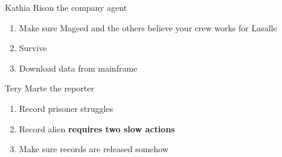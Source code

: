 \newsect

\begin{rpg-commentbox}{Kathia Rison the company agent}
    \begin{enumerate}[label=Act \arabic*]
        \item Make sure Mageed and the others believe your crew works for Lasalle
        \item Survive
        \item Download data from mainframe
    \end{enumerate}
    
\end{rpg-commentbox}


\begin{rpg-commentbox}{Tery Marte the reporter}
    \begin{enumerate}[label=Act \arabic*]
        \item Record prisoner struggles
        \item Record alien \textbf{requires two slow actions}
        \item Make sure records are released somehow
    \end{enumerate}
\end{rpg-commentbox}








